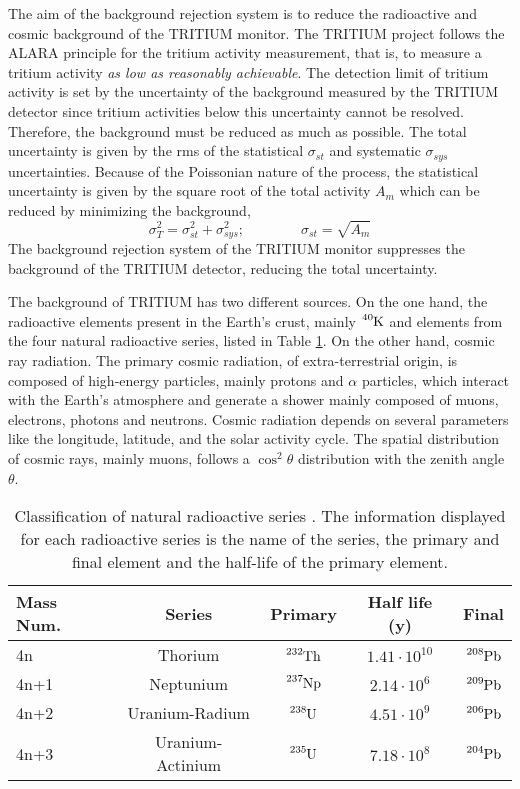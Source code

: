 The aim of the background rejection system is to reduce the radioactive and cosmic background of the TRITIUM monitor. The TRITIUM project follows the ALARA principle for the tritium activity measurement, that is, to measure a tritium activity \textit{as low as reasonably achievable}. The detection limit of tritium activity is set by the uncertainty of the background measured by the TRITIUM detector since tritium activities below this uncertainty cannot be resolved. Therefore, the background must be reduced as much as possible. The total uncertainty is given by the rms of the statistical $\sigma_{st}$ and  systematic $\sigma_{sys}$ uncertainties. Because of the Poissonian nature of the process, the statistical uncertainty is given by the square root of the total activity $A_{m}$ which can be reduced by minimizing the background,
\begin{equation}
\sigma_{T}^2 = \sigma_{st}^2 +\sigma_{sys}^2; \qquad \qquad \sigma_{st} = \sqrt{A_{m}}
\label{eq:SquareSumUncerainty}
\end{equation} 
The background rejection system of the TRITIUM monitor suppresses the background of the TRITIUM detector, reducing the total uncertainty.

The background of TRITIUM has two different sources. On the one hand, the radioactive elements present in the Earth's crust, mainly $\ce{^{40}K}$ and elements from the four natural radioactive series, listed in Table \ref{tab:NaturalRadioactiveSeries}. On the other hand, cosmic ray radiation. The primary cosmic radiation, of extra-terrestrial origin, is composed of high-energy particles, mainly protons and $\alpha$ particles, which interact with the Earth's atmosphere and generate a shower mainly composed of muons, electrons, photons and neutrons. Cosmic radiation depends on several parameters like the longitude, latitude, and the solar activity cycle. The spatial distribution of cosmic rays, mainly muons, follows a $\cos^2\theta$ distribution with the zenith angle $\theta$. 

\begin{table}[htbp]
\centering{}%
\begin{tabular}{lcccc}
\toprule 
Mass Num. & Series & Primary & Half life (y) & Final \tabularnewline
\midrule
\midrule 
4n & Thorium & $\ce{^{232}Th}$ & $1.41 \cdot{} 10^{10}$ & $\ce{^{208}Pb}$ \tabularnewline
4n+1 & Neptunium & $\ce{^{237}Np}$ & $2.14 \cdot{} 10^{6}$ & $\ce{^{209}Pb}$ \tabularnewline
4n+2 & Uranium-Radium & $\ce{^{238}U}$ & $4.51 \cdot{} 10^{9}$ & $\ce{^{206}Pb}$ \tabularnewline
4n+3 & Uranium-Actinium & $\ce{^{235}U}$ & $7.18 \cdot{} 10^{8}$ & $\ce{^{204}Pb}$ \tabularnewline
\bottomrule
\end{tabular}
\caption{Classification of natural radioactive series \cite{NaturalRadioactiveSeries1, NaturalRadioactiveSeries2}. The information displayed for each radioactive series is the name of the series, the primary and final element and the half-life of the primary element.}
\label{tab:NaturalRadioactiveSeries}
\end{table}

